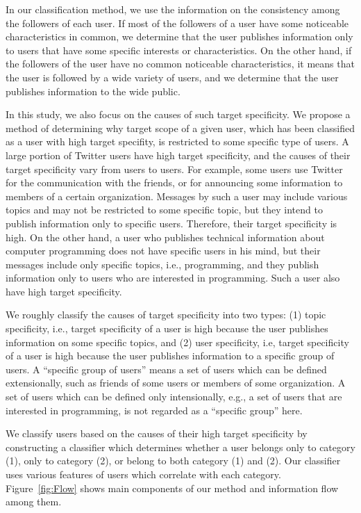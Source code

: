 In our classification method, we use the information on the
consistency among the followers of each user.  If most of the
followers of a user have some noticeable characteristics in common, we
determine that the user publishes information only to users that have
some specific interests or characteristics.  On the other hand, if the
followers of the user have no common noticeable characteristics, it
means that the user is followed by a wide variety of users, and we
determine that the user publishes information to the wide public.

In this study, we also focus on the causes of such target specificity.
We propose a method of determining why target scope of a given user,
which has been classified as a user with high target specifity, is
restricted to some specific type of users.  A large portion of Twitter
users have high target specificity, and the causes of their target
specificity vary from users to users.  For example, some users use
Twitter for the communication with the friends, or for announcing some
information to members of a certain organization.  Messages by such a
user may include various topics and may not be restricted to some
specific topic, but they intend to publish information only to
specific users.  Therefore, their target specificity is high.  On the
other hand, a user who publishes technical information about computer
programming does not have specific users in his mind, but their
messages include only specific topics, i.e., programming, and they
publish information only to users who are interested in programming.
Such a user also have high target specificity.

We roughly classify the causes of target specificity into two types:
(1) topic specificity, i.e., target specificity of a user is high
because the user publishes information on some specific topics, and
(2) user specificity, i.e, target specificity of a user is high
because the user publishes information to a specific group of users.
A ``specific group of users'' means a set of users which can be
defined extensionally, such as friends of some users or members of
some organization.  A set of users which can be defined only
intensionally, e.g., a set of users that are interested in
programming, is not regarded as a ``specific group'' here.

We classify users based on the causes of their high target specificity
by constructing a classifier which determines whether a
user belongs only to category (1), only to category (2), or belong to
both category (1) and (2).  Our classifier uses various features of
users which correlate with each category.  Figure~\ref{fig:Flow} shows
main components of our method and information flow among them.


